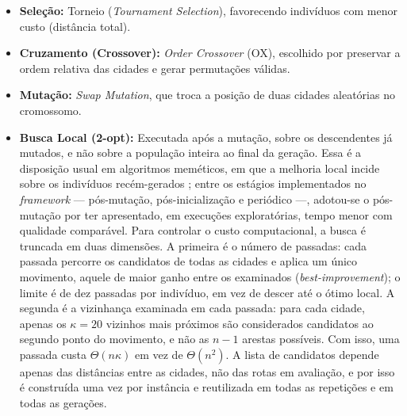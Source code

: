 \begin{itemize}
        Há também um motivo de memória para não usar \(n_{pop} \propto n_{coords}\).
        Na variante residente, a matriz ocupa \(O(n_{coords}^2)\) e as populações ocupam \(O(n_{pop} \cdot n_{coords})\); a razão entre os dois termos é \(n_{pop}/n_{coords}\), ou seja, eles se igualam quando \(n_{pop} = n_{coords}\).
        Com \(n_{pop}\) fixo, a matriz domina; com \(n_{pop} = 2\,n_{coords}\), a população deixa de ser desprezível e passa a ser um segundo termo quadrático, com coeficiente duas vezes maior que o da matriz.
        Não chega a ser uma explosão de memória — ambos continuam quadráticos —, mas dobra o termo dominante e reduz bastante o porte das instâncias que cabem nos \(4\) GB da placa.
        O valor fixo atende, portanto, à prática da literatura e preserva a matriz como o fator limitante controlável.
  \item
        \textbf{Seleção:} Torneio (\emph{Tournament Selection}), favorecendo indivíduos com menor custo (distância total).
  \item
        \textbf{Cruzamento (Crossover):} \emph{Order Crossover} (OX), escolhido por preservar a ordem relativa das cidades e gerar permutações válidas.
  \item
        \textbf{Mutação:} \emph{Swap Mutation}, que troca a posição de duas cidades aleatórias no cromossomo.
  \item
\textbf{Busca Local (2-opt):} Executada após a mutação, sobre os descendentes já mutados, e não sobre a população inteira ao final da geração.
Essa é a disposição usual em algoritmos meméticos, em que a melhoria local incide sobre os indivíduos recém-gerados \autocite{alsheddy2017memetic,larranaga1999genetic}; entre os estágios implementados no \emph{framework} --- pós-mutação, pós-inicialização e periódico ---, adotou-se o pós-mutação por ter apresentado, em execuções exploratórias, tempo menor com qualidade comparável.
Para controlar o custo computacional, a busca é truncada em duas dimensões.
A primeira é o número de passadas: cada passada percorre os candidatos de todas as cidades e aplica um único movimento, aquele de maior ganho entre os examinados (\emph{best-improvement}); o limite é de dez passadas por indivíduo, em vez de descer até o ótimo local.
A segunda é a vizinhança examinada em cada passada: para cada cidade, apenas os \(\kappa = 20\) vizinhos mais próximos são considerados candidatos ao segundo ponto do movimento, e não as \(n - 1\) arestas possíveis.
Com isso, uma passada custa \(\Theta(n\kappa)\) em vez de \(\Theta(n^2)\).
A lista de candidatos depende apenas das distâncias entre as cidades, não das rotas em avaliação, e por isso é construída uma vez por instância e reutilizada em todas as repetições e em todas as gerações.

\end{itemize}

